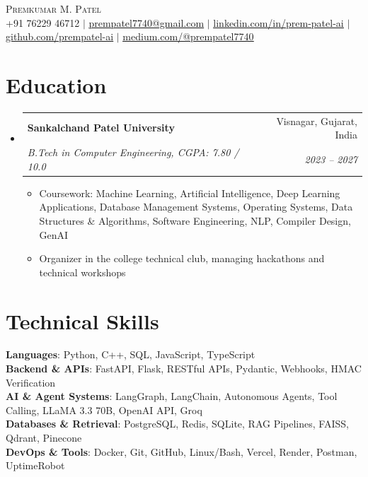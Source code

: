 \documentclass[letterpaper,10pt]{article}
\makeatletter
\newcommand{\resumeItem}[1]{
  \item\small{
    {#1 \vspace{-1.2pt}}
  }
}
\newcommand{\resumeSubheading}[4]{
  \vspace{3pt}\item
    \begin{tabular*}{0.985\textwidth}[t]{l@{\extracolsep{\fill}}r}
      \textbf{#1} & \small #2 \\
      \textit{\small#3} & \textit{\small #4} \\
    \end{tabular*}\vspace{-2pt}
}
\newcommand{\resumeSubHeadingListStart}{\begin{itemize}[leftmargin=0.0in, label={}, itemsep=2pt]}
\newcommand{\resumeSubHeadingListEnd}{\end{itemize}}
\newcommand{\resumeItemListStart}{\begin{itemize}[leftmargin=0.16in, itemsep=1pt, topsep=2pt, parsep=0pt]}
\newcommand{\resumeItemListEnd}{\end{itemize}\vspace{0pt}}
\makeatother
\begin{document}
\begin{center}
    {\Huge \scshape Premkumar M. Patel} \\ \vspace{5pt}
    \small +91 76229 46712 $|$
    \href{mailto:prempatel7740@gmail.com}{\underline{prempatel7740@gmail.com}} $|$
    \href{https://linkedin.com/in/prem-patel-ai}{\underline{linkedin.com/in/prem-patel-ai}} $|$
    \href{https://github.com/prempatel-ai}{\underline{github.com/prempatel-ai}} $|$
    \href{https://medium.com/@prempatel7740}{\underline{medium.com/@prempatel7740}}
\end{center}

\section{Education}
  \resumeSubHeadingListStart
    \resumeSubheading
      {Sankalchand Patel University}{Visnagar, Gujarat, India}
      {B.Tech in Computer Engineering, CGPA: 7.80 / 10.0}{2023 -- 2027}
      \resumeItemListStart
        \resumeItem{Coursework: Machine Learning, Artificial Intelligence, Deep Learning Applications, Database Management Systems, Operating Systems, Data Structures \& Algorithms, Software Engineering, NLP, Compiler Design, GenAI}
        \resumeItem{Organizer in the college technical club, managing hackathons and technical workshops}
      \resumeItemListEnd
  \resumeSubHeadingListEnd

\section{Technical Skills}
 \begin{itemize}[leftmargin=0.0in, label={}, noitemsep, topsep=1.5pt]
    \small{\item{
     \textbf{Languages}: Python, C++, SQL, JavaScript, TypeScript \\
     \textbf{Backend \& APIs}: FastAPI, Flask, RESTful APIs, Pydantic, Webhooks, HMAC Verification \\
     \textbf{AI \& Agent Systems}: LangGraph, LangChain, Autonomous Agents, Tool Calling, LLaMA 3.3 70B, OpenAI API, Groq \\
     \textbf{Databases \& Retrieval}: PostgreSQL, Redis, SQLite, RAG Pipelines, FAISS, Qdrant, Pinecone \\
     \textbf{DevOps \& Tools}: Docker, Git, GitHub, Linux/Bash, Vercel, Render, Postman, UptimeRobot
    }}
 \end{itemize}
\end{document}

